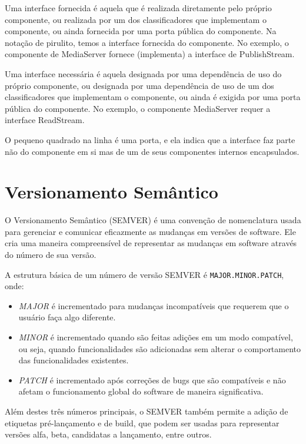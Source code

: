 \documentclass[12pt, %
openright, 
oneside, %
a4paper,    %
brazil]{facom-ufu-abntex2}
\begin{document}
Uma interface fornecida é aquela que é realizada diretamente pelo próprio
componente, ou realizada por um dos classificadores que implementam o
componente, ou ainda fornecida por uma porta pública do componente. Na notação
de pirulito, temos a interface fornecida do componente. No exemplo, o
componente de MediaServer fornece (implementa) a interface de PublishStream.

Uma interface necessária é aquela designada por uma dependência de uso do
próprio componente, ou designada por uma dependência de uso de um dos
classificadores que implementam o componente, ou ainda é exigida por uma porta
pública do componente. No exemplo, o componente MediaServer requer a interface
ReadStream.

O pequeno quadrado na linha é uma porta, e ela indica que a interface faz parte
não do componente em si mas de um de seus componentes internos encapsulados.

\section{Versionamento Semântico}

O Versionamento Semântico (SEMVER) é uma convenção de nomenclatura usada para
gerenciar e comunicar eficazmente as mudanças em versões de software. Ele cria
uma maneira compreensível de representar as mudanças em software através do
número de sua versão.

A estrutura básica de um número de versão SEMVER é \texttt{MAJOR.MINOR.PATCH},
onde:

\begin{itemize}
	\item \textit{MAJOR} é incrementado para mudanças incompatíveis que
	      requerem que o usuário faça algo diferente.
	\item \textit{MINOR} é incrementado quando são feitas adições em um
	      modo compatível, ou seja, quando funcionalidades são adicionadas
	      sem alterar o comportamento das funcionalidades existentes.
	\item \textit{PATCH} é incrementado após correções de bugs que são
	      compatíveis e não afetam o funcionamento global do software de
	      maneira significativa.
\end{itemize}

Além destes três números principais, o SEMVER também permite a adição de
etiquetas pré-lançamento e de build, que podem ser usadas para representar
versões alfa, beta, candidatas a lançamento, entre outros.
\end{document}

